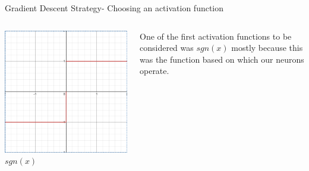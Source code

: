 \begin{frame}{Gradient Descent Strategy- Choosing an activation function}
	\begin{columns}[T]
        \begin{column}{0.5\textwidth}
        	\includegraphics[width=\textwidth]{images/sgn.png}
        	\tiny{\textit{$sgn(x)$}}
        \end{column}
	    \begin{column}{0.5\textwidth}
    	    One of the first activation functions to be considered was $sgn(x)$ mostly because this was the function based on which our neurons operate.
    	\end{column}
    \end{columns}
\end{frame}


